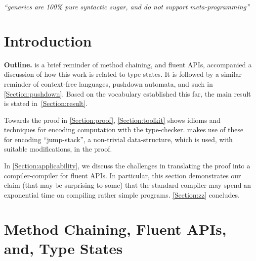 \documentclass[a4paper,USenglish]{lipics}
\author{Joseph (Yossi) Gil \& Tomer Levy
}
\begin{document}
\maketitle
\hfill
\parbox{40ex}{%
  \begin{flushright}
    \scriptsize\itshape ``\Java   generics are 100\% pure syntactic sugar,
    and do not support meta-programming''\footnotemark
  \end{flushright}
}
\newline


\begin{abstract}
  
\end{abstract}

\section{Introduction}


\textbf{Outline.}
 is a brief reminder of method chaining, 
  and fluent APIs, accompanied a discussion of how this work is related to type states.
It is followed by a similar reminder of context-free languages, pushdown automata, 
  and such in \cref{Section:pushdown}.
Based on the vocabulary established this far, 
  the main result is stated in~\cref{Section:result}.

Towards the proof in \cref{Section:proof}, \cref{Section:toolkit} 
  shows idioms and techniques for encoding computation with    
  the \Java type-checker.
 makes use of these for encoding 
  ``jump-stack'', a non-trivial data-structure,
  which is used, with suitable modifications, in the proof. 

In \cref{Section:applicability}, we discuss the challenges in
  translating the proof into a compiler-compiler for fluent APIs.
In particular, this section demonstrates our claim (that may be
  surprising to some) that the standard \Java compiler may spend
  an exponential time on compiling rather simple programs.
\cref{Section:zz} concludes.

\section{Method Chaining, Fluent APIs, and, Type States}
\label{Section:fluent}

\end{document}
